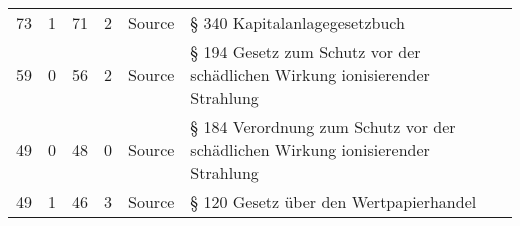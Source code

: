 \begin{tabular}{rrrrlp{}p{}}
    73 &       1 &           71 &            2 & Source          & § 340 Kapitalanlagegesetzbuch                                                           &                        \\
    59 &       0 &           56 &            2 & Source          & § 194 Gesetz zum Schutz vor der schädlichen Wirkung ionisierender Strahlung             &                        \\
    49 &       0 &           48 &            0 & Source          & § 184 Verordnung zum Schutz vor der schädlichen Wirkung ionisierender Strahlung         &                        \\
    49 &       1 &           46 &            3 & Source          & § 120 Gesetz über den Wertpapierhandel                                                  &                        \\
\hline
\end{tabular}